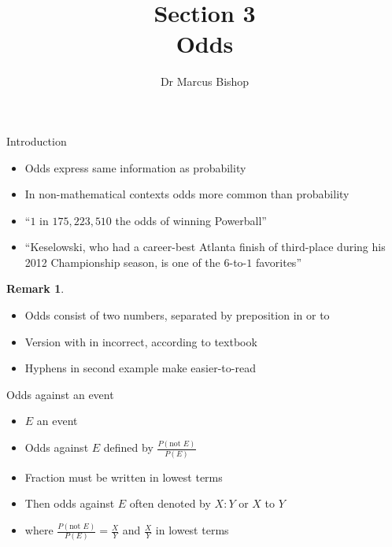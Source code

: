\documentclass{beamer}
\title[\S3]{Section 3\\Odds}
\author{Dr Marcus Bishop}
\theoremstyle{definition}
\newtheorem{remark}{Remark}
\begin{document}
\begin{frame}\titlepage\end{frame}
\LogoOff

\begin{frame}{Introduction}
\begin{itemize}
\item \alert{Odds} express same information as probability
\item In non-mathematical contexts
odds more common than probability
\end{itemize}
\begin{example}
\begin{itemize}
\item ``\alert{$1$ in $175,223,510$} the odds of winning Powerball''
\item ``Keselowski, who had a career-best Atlanta finish of third-place
during his 2012 Championship season, is one of the \alert{$6$-to-$1$} favorites''
\end{itemize}
\end{example}
\begin{remark}
\begin{itemize}
\item Odds consist of two numbers, separated by preposition \alert{in} or \alert{to}
\item Version with \alert{in} incorrect, according to textbook
\item Hyphens in second example make \alert{easier-to-read}
\end{itemize}
\end{remark}
\end{frame}

\begin{frame}{Odds against an event}
\begin{definition}
\begin{itemize}
\item $E$ an event
\item \alert{Odds against $E$} defined by
$\frac{P\left(\text{not $E$}\right)}{P\left(E\right)}$
\item Fraction must be written in \alert{lowest terms}
\item Then odds against $E$ often denoted by \alert{$X:Y$} or \alert{$X$ to $Y$}
\item[]where $\frac{P\left(\text{not $E$}\right)}{P\left(E\right)}
=\frac{X}{Y}$ and $\frac{X}{Y}$ in lowest terms
\end{itemize}
\end{definition}
\end{frame}
\end{document}
